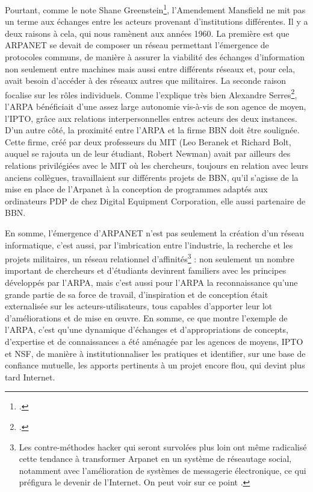 \documentclass{FramateX}
\begin{document}
\begin{refsection}
Pourtant, comme le note Shane Greenstein\footnote{\cite{greensteinnurturing2011}.},
l'Amendement Mansfield ne mit pas un terme aux
échanges entre les acteurs provenant d'institutions
différentes. Il y a deux raisons à cela, qui nous ramènent aux années
1960. La première est que ARPANET se devait de composer un réseau
permettant l'émergence de protocoles communs, de
manière à assurer la viabilité des échanges
d'information non seulement entre machines mais aussi
entre différents réseaux et, pour cela, avait besoin
d'accéder à des réseaux autres que militaires. La
seconde raison focalise sur les rôles individuels. Comme
l'explique très bien Alexandre Serres\footnote{\cite[p.~347 \textit{sq.}]{serresaux2000}.},
l'ARPA bénéficiait d'une assez large
autonomie vis-à-vis de son agence de moyen, l'IPTO,
grâce aux relations interpersonnelles entres acteurs des deux
instances. D'un autre côté, la proximité entre l'ARPA
et la firme BBN doit être soulignée. Cette firme, créé par deux
professeurs du MIT (Leo Beranek et Richard Bolt, auquel se rajouta un
de leur étudiant, Robert Newman) avait par ailleurs des relations
privilégiées avec le MIT où les chercheurs, toujours en relation avec
leurs anciens collègues, travaillaient sur différents projets de BBN,
qu'il s'agisse de la mise en place de
l'Arpanet à la conception de programmes adaptés aux
ordinateurs PDP de chez Digital Equipment Corporation, elle aussi
partenaire de BBN.

En somme, l'émergence d'ARPANET
n'est pas seulement la création d'un
réseau informatique, c'est aussi, par
l'imbrication entre l'industrie, la
recherche et les projets militaires, un réseau relationnel
d'affinités\footnote{Les contre-méthodes hacker qui
seront survolées plus loin ont même radicalisé cette tendance à
transformer Arpanet en un système de réseautage social, notamment avec
l'amélioration de systèmes de messagerie électronique, ce qui préfigura
le devenir de l'Internet. On peut voir sur ce point \cite{paloquebergesentre2011}.} : non seulement un nombre
important de chercheurs et d'étudiants devinrent
familiers avec les principes développés par l'ARPA,
mais c'est aussi pour l'ARPA la
reconnaissance qu'une grande partie de sa force de
travail, d'inspiration et de conception était
externalisée sur les acteurs-utilisateurs, tous capables
d'apporter leur lot d'améliorations
et de mise en œuvre. En somme, ce que montre l'exemple
de l'ARPA, c'est
qu'une dynamique d'échanges et
d'appropriations de concepts,
d'expertise et de connaissances a été aménagée par les
agences de moyens, IPTO et NSF, de manière à institutionnaliser les
pratiques et identifier, sur une base de confiance mutuelle, les
apports pertinents à un projet encore flou, qui devint plus tard
Internet.


\end{refsection}
\end{document}
